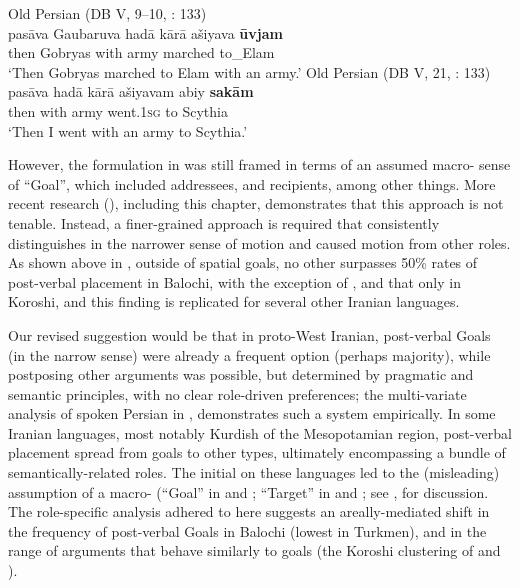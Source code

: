 \documentclass[output=paper,colorlinks,citecolor=brown,draftmode]{langscibook}
\begin{document}
\ea\label{Balochi:ex:22}
\ea\label{Balochi:ex:22a}
Old Persian (DB V, 9–10, \citealt{kent_old_1953}: 133) \\
\gll pasāva Gaubaruva hadā kārā ašiyava \textbf{ūvjam} \\
then Gobryas with army marched to\_Elam \\
\glt `Then Gobryas marched to Elam with an army.'
\ex\label{Balochi:ex:22b}
Old Persian (DB V, 21, \citealt{kent_old_1953}: 133) \\
\gll pasāva hadā kārā ašiyavam abiy \textbf{sakām} \\
then with army went.\textsc{1sg} to Scythia \\
\glt `Then I went with an army to Scythia.'
\z
\z

However, the formulation in \citet{haig_verb-goal_2015} was still framed in terms of an assumed macro- sense of ``Goal'', which included addressees, and recipients, among other things. More recent research (), including this chapter, demonstrates that this approach is not tenable. Instead, a finer-grained approach is required that consistently distinguishes  in the narrower sense of motion and caused motion from other roles. As shown above in , outside of spatial goals, no other  surpasses 50\% rates of post-verbal placement in Balochi, with the exception of , and that only in Koroshi, and this finding is replicated for several other Iranian languages.

Our revised suggestion would be that in proto-West Iranian, post-verbal Goals (in the narrow sense) were already a frequent option (perhaps majority), while postposing other arguments was possible, but determined by pragmatic and semantic principles, with no clear role-driven preferences; the multi-variate analysis of spoken Persian in , demonstrates such a system empirically. In some Iranian languages, most notably Kurdish of the Mesopotamian region, post-verbal placement spread from goals to other  types, ultimately encompassing a bundle of semantically-related roles. The initial  on these languages led to the (misleading) assumption of a macro- (``Goal'' in \citealt{haig_post-predicate_2014} and \citealt{haig_verb-goal_2015}; ``Target'' in \citealt{asadpour_word_2022} and \citealt{jugel_word_2022}; see , for discussion. The role-specific analysis adhered to here suggests an areally-mediated shift in the frequency of post-verbal Goals in Balochi (lowest in Turkmen), and in the range of arguments that behave similarly to goals (the Koroshi clustering of  and ).
\end{document}
